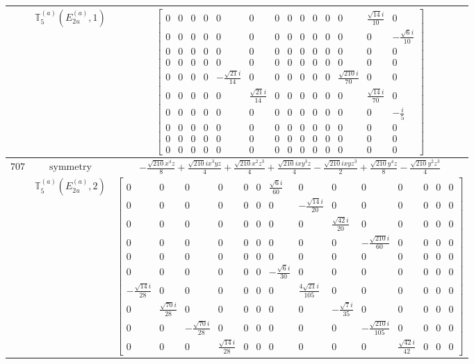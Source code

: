 \documentclass[fleqn,8pt,landscape]{jsarticle}
\begin{document}
\begin{longtable}{ccc}
$  $ & $ \mathbb{T}_{5}^{(a)}(E_{2u}^{(a)},1) $ & $ \begin{bmatrix} 0 & 0 & 0 & 0 & 0 & 0 & 0 & 0 & 0 & 0 & 0 & 0 & \frac{\sqrt{14} i}{10} & 0 \\ 0 & 0 & 0 & 0 & 0 & 0 & 0 & 0 & 0 & 0 & 0 & 0 & 0 & - \frac{\sqrt{6} i}{10} \\ 0 & 0 & 0 & 0 & 0 & 0 & 0 & 0 & 0 & 0 & 0 & 0 & 0 & 0 \\ 0 & 0 & 0 & 0 & 0 & 0 & 0 & 0 & 0 & 0 & 0 & 0 & 0 & 0 \\ 0 & 0 & 0 & 0 & - \frac{\sqrt{21} i}{14} & 0 & 0 & 0 & 0 & 0 & 0 & \frac{\sqrt{210} i}{70} & 0 & 0 \\ 0 & 0 & 0 & 0 & 0 & \frac{\sqrt{21} i}{14} & 0 & 0 & 0 & 0 & 0 & 0 & \frac{\sqrt{14} i}{70} & 0 \\ 0 & 0 & 0 & 0 & 0 & 0 & 0 & 0 & 0 & 0 & 0 & 0 & 0 & - \frac{i}{5} \\ 0 & 0 & 0 & 0 & 0 & 0 & 0 & 0 & 0 & 0 & 0 & 0 & 0 & 0 \\ 0 & 0 & 0 & 0 & 0 & 0 & 0 & 0 & 0 & 0 & 0 & 0 & 0 & 0 \\ 0 & 0 & 0 & 0 & 0 & 0 & 0 & 0 & 0 & 0 & 0 & 0 & 0 & 0 \end{bmatrix} $ \\ \hline
$ 707 $ & $ \text{symmetry} $ & $ - \frac{\sqrt{210} x^{4} z}{8} + \frac{\sqrt{210} i x^{3} y z}{4} + \frac{\sqrt{210} x^{2} z^{3}}{4} + \frac{\sqrt{210} i x y^{3} z}{4} - \frac{\sqrt{210} i x y z^{3}}{2} + \frac{\sqrt{210} y^{4} z}{8} - \frac{\sqrt{210} y^{2} z^{3}}{4} $ \\
$  $ & $ \mathbb{T}_{5}^{(a)}(E_{2u}^{(a)},2) $ & $ \begin{bmatrix} 0 & 0 & 0 & 0 & 0 & 0 & \frac{\sqrt{6} i}{60} & 0 & 0 & 0 & 0 & 0 & 0 & 0 \\ 0 & 0 & 0 & 0 & 0 & 0 & 0 & - \frac{\sqrt{14} i}{20} & 0 & 0 & 0 & 0 & 0 & 0 \\ 0 & 0 & 0 & 0 & 0 & 0 & 0 & 0 & \frac{\sqrt{42} i}{20} & 0 & 0 & 0 & 0 & 0 \\ 0 & 0 & 0 & 0 & 0 & 0 & 0 & 0 & 0 & - \frac{\sqrt{210} i}{60} & 0 & 0 & 0 & 0 \\ 0 & 0 & 0 & 0 & 0 & 0 & 0 & 0 & 0 & 0 & 0 & 0 & 0 & 0 \\ 0 & 0 & 0 & 0 & 0 & 0 & - \frac{\sqrt{6} i}{30} & 0 & 0 & 0 & 0 & 0 & 0 & 0 \\ - \frac{\sqrt{14} i}{28} & 0 & 0 & 0 & 0 & 0 & 0 & \frac{4 \sqrt{21} i}{105} & 0 & 0 & 0 & 0 & 0 & 0 \\ 0 & \frac{\sqrt{70} i}{28} & 0 & 0 & 0 & 0 & 0 & 0 & - \frac{\sqrt{7} i}{35} & 0 & 0 & 0 & 0 & 0 \\ 0 & 0 & - \frac{\sqrt{70} i}{28} & 0 & 0 & 0 & 0 & 0 & 0 & - \frac{\sqrt{210} i}{105} & 0 & 0 & 0 & 0 \\ 0 & 0 & 0 & \frac{\sqrt{14} i}{28} & 0 & 0 & 0 & 0 & 0 & 0 & \frac{\sqrt{42} i}{42} & 0 & 0 & 0 \end{bmatrix} $ \\ \hline

\end{longtable}
\end{document}
